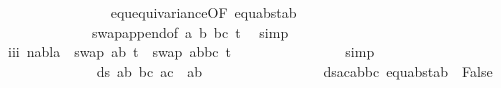 \begin{isabellebody}
\ \ \ \ \ \ \ \ \ \ \ \ \ \ \isamarkupfalse%
\ equ{\isacharunderscore}{\kern0pt}equivariance{\isacharbrackleft}{\kern0pt}OF\ equ{\isacharunderscore}{\kern0pt}abst{\isacharunderscore}{\kern0pt}ab{\isacharparenleft}{\kern0pt}{}{\isacharparenright}{\kern0pt}{\isacharbrackright}{\kern0pt}\isanewline
\ \ \ \ \ \ \ \ \ \ \ \ \ swap{\isacharunderscore}{\kern0pt}append{\isacharbrackleft}{\kern0pt}of\ {\isacartoucheopen}{\isacharbrackleft}{\kern0pt}{\isacharparenleft}{\kern0pt}a{\isacharcomma}{\kern0pt}\ b{\isacharparenright}{\kern0pt}{\isacharbrackright}{\kern0pt}{\isacartoucheclose}\ {\isacartoucheopen}{\isacharbrackleft}{\kern0pt}{\isacharparenleft}{\kern0pt}b{\isacharcomma}{\kern0pt}c{\isacharparenright}{\kern0pt}{\isacharbrackright}{\kern0pt}{\isacartoucheclose}\ t{}{\isacharprime}{\kern0pt}{\isacharbrackright}{\kern0pt}\ \isamarkupfalse%
\ simp\isanewline
\ \ \ \ \ \ \ \ \ \ \ \ \isamarkupfalse%
\ \isamarkupfalse%
\ iii{\isacharcolon}{\kern0pt}\ {\isachardoublequoteopen}nabla\ {\isasymturnstile}\ swap\ {\isacharbrackleft}{\kern0pt}{\isacharparenleft}{\kern0pt}a{\isacharcomma}{\kern0pt}b{\isacharparenright}{\kern0pt}{\isacharbrackright}{\kern0pt}\ t{}{\isacharprime}{\kern0pt}\ {\isasymapprox}\ swap\ {\isacharparenleft}{\kern0pt}{\isacharbrackleft}{\kern0pt}{\isacharparenleft}{\kern0pt}a{\isacharcomma}{\kern0pt}b{\isacharparenright}{\kern0pt}{\isacharcomma}{\kern0pt}{\isacharparenleft}{\kern0pt}b{\isacharcomma}{\kern0pt}c{\isacharparenright}{\kern0pt}{\isacharbrackright}{\kern0pt}{\isacharparenright}{\kern0pt}\ t{}{\isacharprime}{\kern0pt}{\isachardoublequoteclose}\isanewline
\ \ \ \ \ \ \ \ \ \ \ \ \ \ \isamarkupfalse%
\ simp\isanewline
\ \ \ \ \ \ \ \ \ \ \ \ \isanewline
\ \ \ \ \ \ \ \ \ \ \ \ \isamarkupfalse%
\ {\isachardoublequoteopen}ds\ {\isacharbrackleft}{\kern0pt}{\isacharparenleft}{\kern0pt}a{\isacharcomma}{\kern0pt}b{\isacharparenright}{\kern0pt}{\isacharcomma}{\kern0pt}\ {\isacharparenleft}{\kern0pt}b{\isacharcomma}{\kern0pt}c{\isacharparenright}{\kern0pt}{\isacharbrackright}{\kern0pt}\ {\isacharbrackleft}{\kern0pt}{\isacharparenleft}{\kern0pt}a{\isacharcomma}{\kern0pt}c{\isacharparenright}{\kern0pt}{\isacharbrackright}{\kern0pt}\ {\isacharequal}{\kern0pt}\ {\isacharbraceleft}{\kern0pt}a{\isacharcomma}{\kern0pt}b{\isacharbraceright}{\kern0pt}{\isachardoublequoteclose}\ \isanewline
\ \ \ \ \ \ \ \ \ \ \ \ \ \ \isamarkupfalse%
\ ds{\isacharunderscore}{\kern0pt}acabbc\ equ{\isacharunderscore}{\kern0pt}abst{\isacharunderscore}{\kern0pt}ab\ {}\ False\ \isamarkupfalse%

\end{isabellebody}
